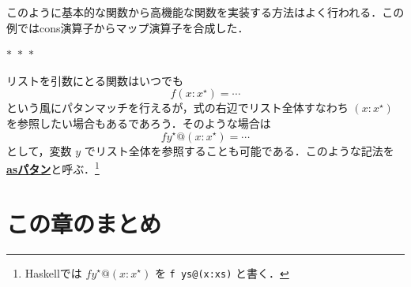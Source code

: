 \documentclass[a4paper,twocolumn]{jsbook}
\newcommand{\separator}{\begin{center}$*$~$*$~$*$\end{center}}
\newcommand{\programminglanguage}[1]{\textsf{#1}}
\newcommand{\haskell}{\programminglanguage{Haskell}}
\newcommand{\keyword}[1]{{\underline{\textbf{#1}}}}
\newcommand{\code}[1]{\texttt{#1}}
\newcommand{\mList}[1]{{#1}^\mathrm{\star}}
\begin{document}
このように基本的な関数から高機能な関数を実装する方法はよく行われる．この例ではcons演算子からマップ演算子を合成した．

\separator

リストを引数にとる関数はいつでも
\begin{equation}
f(x:\mList{x})=\dotsb
\end{equation}
という風にパタンマッチを行えるが，式の右辺でリスト全体すなわち $(x:\mList{x})$ を参照したい場合もあるであろう．そのような場合は
\begin{equation}
f\mList{y}@(x:\mList{x})=\dotsb
\end{equation}
として，変数 $y$ でリスト全体を参照することも可能である．このような記法を\keyword{asパタン}と呼ぶ．\footnote{\haskell では $f\mList{y}@(x:\mList{x})$ を \code{f ys@(x:xs)} と書く．}

\section{この章のまとめ}
\end{document}
